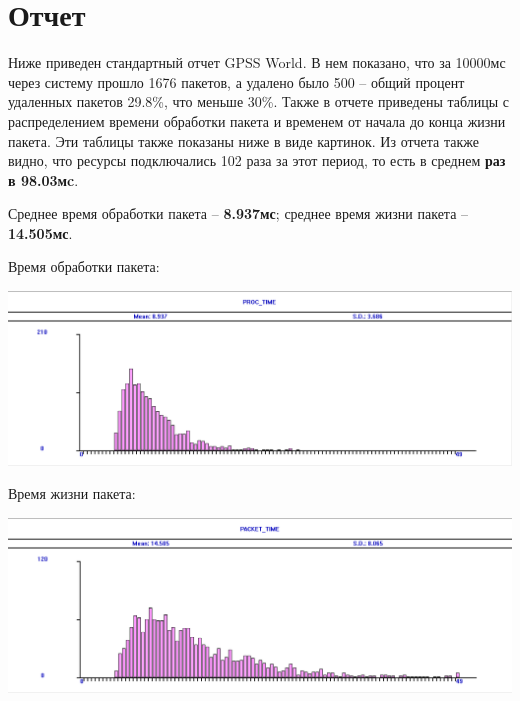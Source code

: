 \documentclass{article}
\begin{document}
\section{Отчет}

Ниже приведен стандартный отчет GPSS World.
В нем показано, что за 10000мс через систему прошло 1676 пакетов, 
а удалено было 500 -- общий процент удаленных пакетов 29.8\%, что меньше 30\%.
Также в отчете приведены таблицы с распределением времени обработки пакета
и временем от начала до конца жизни пакета.
Эти таблицы также показаны ниже в виде картинок.
Из отчета также видно, что ресурсы подключались 102 раза за этот период,
то есть в среднем \textbf{раз в 98.03мc}.

Среднее время обработки пакета -- \textbf{8.937мс};
среднее время жизни пакета -- \textbf{14.505мс}.




\newpage

Время обработки пакета:

\includegraphics[width=\textwidth]{table2}

Время жизни пакета:

\includegraphics[width=\textwidth]{table1}
\end{document}

